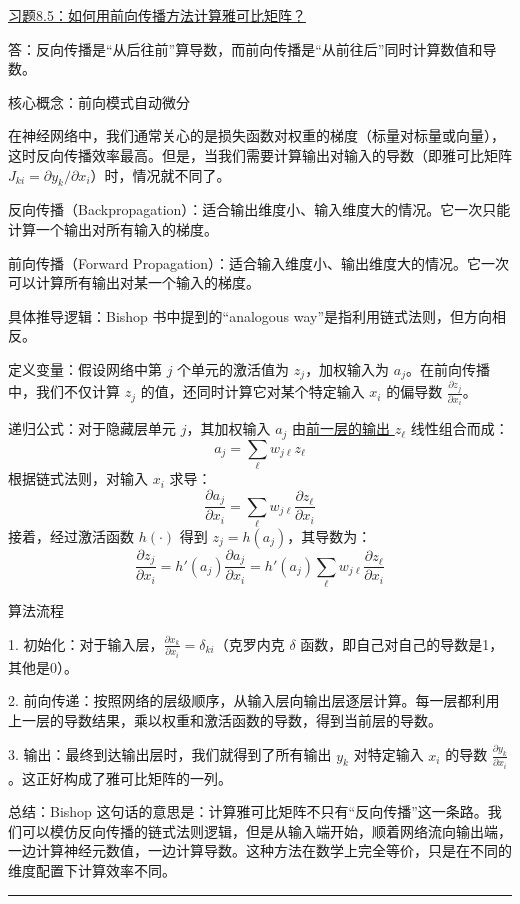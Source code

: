 \documentclass{article}
\begin{document}
{\color{blue}
\underline{习题8.5：如何用前向传播方法计算雅可比矩阵？}

答：反向传播是“从后往前”算导数，而前向传播是“从前往后”同时计算数值和导数。

核心概念：前向模式自动微分

在神经网络中，我们通常关心的是损失函数对权重的梯度（标量对标量或向量），这时反向传播效率最高。但是，当我们需要计算输出对输入的导数（即雅可比矩阵 $J_{ki} = \partial y_k / \partial x_i$）时，情况就不同了。

反向传播（Backpropagation）：适合输出维度小、输入维度大的情况。它一次只能计算一个输出对所有输入的梯度。

前向传播（Forward Propagation）：适合输入维度小、输出维度大的情况。它一次可以计算所有输出对某一个输入的梯度。

具体推导逻辑：Bishop 书中提到的“analogous way”是指利用链式法则，但方向相反。

定义变量：假设网络中第 $j$ 个单元的激活值为 $z_j$，加权输入为 $a_j$。在前向传播中，我们不仅计算 $z_j$ 的值，还同时计算它对某个特定输入 $x_i$ 的偏导数 $\frac{\partial z_j}{\partial x_i}$。

递归公式：对于隐藏层单元 $j$，其加权输入 $a_j$ 由\underline{前一层的输出 $z_\ell$} 线性组合而成：
$$ a_j = \sum_\ell w_{j\ell} z_\ell $$
根据链式法则，对输入 $x_i$ 求导：
$$ \frac{\partial a_j}{\partial x_i} = \sum_\ell w_{j\ell} \frac{\partial z_\ell}{\partial x_i} $$
接着，经过激活函数 $h(\cdot)$ 得到 $z_j = h(a_j)$，其导数为：
$$ \frac{\partial z_j}{\partial x_i} = h'(a_j) \frac{\partial a_j}{\partial x_i} 
= h'(a_j) \sum_\ell w_{j\ell} \frac{\partial z_\ell}{\partial x_i} 
$$

算法流程

1. 初始化：对于输入层，$\frac{\partial x_k}{\partial x_i} = \delta_{ki}$（克罗内克 $\delta$ 函数，即自己对自己的导数是1，其他是0）。

2. 前向传递：按照网络的层级顺序，从输入层向输出层逐层计算。每一层都利用上一层的导数结果，乘以权重和激活函数的导数，得到当前层的导数。

3. 输出：最终到达输出层时，我们就得到了所有输出 $y_k$ 对特定输入 $x_i$ 的导数 $\frac{\partial y_k}{\partial x_i}$。这正好构成了雅可比矩阵的一列。

总结：Bishop 这句话的意思是：计算雅可比矩阵不只有“反向传播”这一条路。我们可以模仿反向传播的链式法则逻辑，但是从输入端开始，顺着网络流向输出端，一边计算神经元数值，一边计算导数。这种方法在数学上完全等价，只是在不同的维度配置下计算效率不同。
}

\noindent\rule{\linewidth}{0.4pt}
\end{document}
